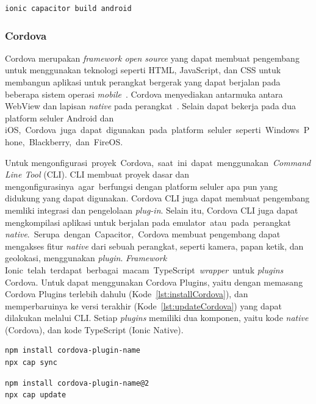 \begin{lstlisting}[label={lst:capbuildandroid}, caption=Kode untuk Membuat Aplikasi Capacitor Untuk Perangkat Android]
ionic capacitor build android
\end{lstlisting}

\subsubsection{Cordova}
\label{subsec:cordova}
Cordova merupakan {\it framework open source} yang dapat membuat pengembang untuk menggunakan teknologi seperti HTML, JavaScript, dan CSS untuk membangun aplikasi untuk perangkat bergerak yang dapat berjalan pada beberapa sistem operasi {\it mobile}~\cite{gonsalves:18:evaluating}. Cordova menyediakan antarmuka antara WebView dan lapisan {\it native} pada perangkat~\cite{griffith:17:mobile}. Selain dapat bekerja pada dua platform seluler Android dan iOS,~Cordova~juga~dapat~digunakan~pada~platform~seluler~seperti~Windows~Phone,~Blackberry,~dan~FireOS.

Untuk mengonfigurasi~proyek~Cordova,~saat~ini~dapat~menggunakan~{\it Command Line Tool} (CLI). CLI membuat proyek dasar dan mengonfigurasinya~agar~berfungsi dengan platform seluler apa pun yang didukung yang dapat digunakan. Cordova CLI juga dapat membuat pengembang memliki integrasi dan pengelolaan {\it plug-in}. Selain itu, Cordova CLI juga dapat mengkompilasi aplikasi untuk berjalan pada emulator~atau~pada~perangkat {\it native}.~Serupa~dengan~Capacitor,~Cordova membuat pengembang dapat mengakses fitur {\it native} dari sebuah perangkat, seperti kamera, papan ketik, dan geolokasi, menggunakan {\it plugin}. {\it Framework} Ionic~telah~terdapat~berbagai~macam~TypeScript~{\it wrapper}~untuk {\it plugins} Cordova.  Untuk dapat menggunakan Cordova Plugins, yaitu dengan memasang Cordova Plugins terlebih dahulu (Kode~\ref{lst:installCordova}), dan memperbaruinya ke versi terakhir (Kode~\ref{lst:updateCordova}) yang dapat dilakukan melalui CLI. Setiap {\it plugins} memiliki dua komponen, yaitu kode {\it native} (Cordova), dan kode TypeScript (Ionic Native).

\begin{lstlisting}[label={lst:installCordova}, caption=Kode untuk Memasang Cordova Plugins]
npm install cordova-plugin-name
npx cap sync
\end{lstlisting} 

\begin{lstlisting}[label={lst:updateCordova}, caption=Kode untuk Memperbarui Cordova Plugins]
npm install cordova-plugin-name@2
npx cap update
\end{lstlisting} 

